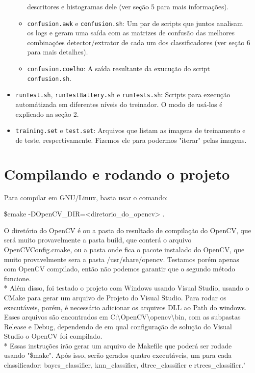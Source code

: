 \documentclass[a4paper,11pt]{article}
\begin{document}
\begin{itemize}
\begin{itemize}
          descritores e histogramas dele (ver seção 5 para mais informações).
        \item \verb$confusion.awk$ e \verb$confusion.sh$:
          Um par de scripts que juntos analisam os logs e geram uma saída com as
          matrizes de confusão das melhores combinações detector/extrator de
          cada um dos classificadores (ver seção 6 para mais detalhes).
        \item \verb$confusion.coelho$:
          A saída resultante da exucução do script \verb$confusion.sh$.
      \end{itemize}
    \item \verb$runTest.sh$, \verb$runTestBattery.sh$ e \verb$runTests.sh$:
      Scripts para execução automátizada em diferentes níveis do treinador. O
      modo de usá-los é explicado na seção 2.
    \item \verb$training.set$ e \verb$test.set$:
      Arquivos que listam as imagens de treinamento e de teste, respectivamente.
      Fizemos ele para podermos "iterar" pelas imagens.
  \end{itemize}

\section{Compilando e rodando o projeto}

Para compilar em GNU/Linux, basta usar o comando:
\begin{center}
 \$cmake -DOpenCV\_DIR=<diretorio\_do\_opencv> .
\end{center}
O diretório do OpenCV é ou a pasta do resultado de compilação do OpenCV, que será muito provavelmente a pasta build, que conterá o arquivo OpenCVConfig.cmake, ou a pasta onde fica o pacote instalado do OpenCV, que muito provavelmente sera a pasta /usr/share/opencv. Testamos porém apenas com OpenCV compilado, então não podemos garantir que o segundo método funcione. \\*
Além disso, foi testado o projeto com Windows usando Visual Studio, usando o CMake para gerar um arquivo de Projeto do Visual Studio. Para rodar os executáveis, porém, é necessário adicionar os arquivos DLL ao Path do windows. Esses arquivos são encontrados em C:\textbackslash OpenCV\textbackslash opencv\textbackslash bin, com as subpastas Release e Debug, dependendo de em qual configuração de solução do Visual Studio o OpenCV foi compilado.\\*
Essas instruções irão gerar um arquivo de Makefile que poderá ser rodade usando "\$make". Após isso, serão gerados quatro executáveis, um para cada classificador: bayes\_classifier, knn\_classifier, dtree\_classifier e rtrees\_classifier."
\end{document}
